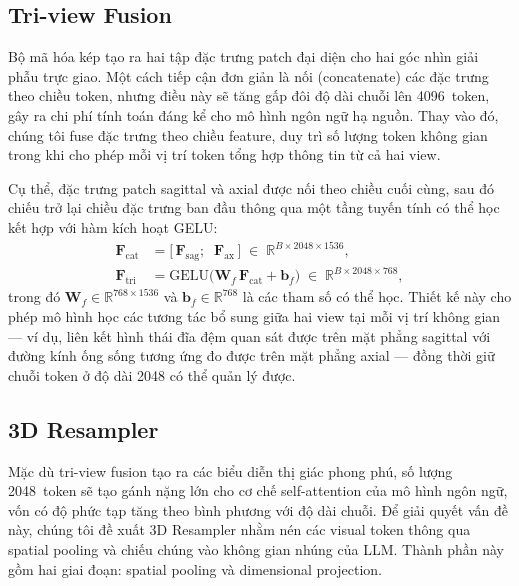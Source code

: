 \subsection{Tri-view Fusion}

Bộ mã hóa kép tạo ra hai tập đặc trưng patch đại diện cho hai góc nhìn giải phẫu trực giao. Một cách tiếp cận đơn giản là nối (concatenate) các đặc trưng theo chiều token, nhưng điều này sẽ tăng gấp đôi độ dài chuỗi lên 4096~token, gây ra chi phí tính toán đáng kể cho mô hình ngôn ngữ hạ nguồn. Thay vào đó, chúng tôi fuse đặc trưng theo chiều feature, duy trì số lượng token không gian trong khi cho phép mỗi vị trí token tổng hợp thông tin từ cả hai view.

Cụ thể, đặc trưng patch sagittal và axial được nối theo chiều cuối cùng, sau đó chiếu trở lại chiều đặc trưng ban đầu thông qua một tầng tuyến tính có thể học kết hợp với hàm kích hoạt GELU:
\begin{align}
\mathbf{F}_{\text{cat}} &= \big[\, \mathbf{F}_{\text{sag}} ;\;\; \mathbf{F}_{\text{ax}} \,\big] \;\in\; \mathbb{R}^{B \times 2048 \times 1536}, \label{eq:concat} \\[4pt]
\mathbf{F}_{\text{tri}} &= \text{GELU}\!\big(\mathbf{W}_f \, \mathbf{F}_{\text{cat}} + \mathbf{b}_f\big) \;\in\; \mathbb{R}^{B \times 2048 \times 768}, \label{eq:trifuse}
\end{align}
trong đó $\mathbf{W}_f \in \mathbb{R}^{768 \times 1536}$ và $\mathbf{b}_f \in \mathbb{R}^{768}$ là các tham số có thể học. Thiết kế này cho phép mô hình học các tương tác bổ sung giữa hai view tại mỗi vị trí không gian --- ví dụ, liên kết hình thái đĩa đệm quan sát được trên mặt phẳng sagittal với đường kính ống sống tương ứng đo được trên mặt phẳng axial --- đồng thời giữ chuỗi token ở độ dài 2048 có thể quản lý được.


\subsection{3D Resampler}

Mặc dù tri-view fusion tạo ra các biểu diễn thị giác phong phú, số lượng 2048~token sẽ tạo gánh nặng lớn cho cơ chế self-attention của mô hình ngôn ngữ, vốn có độ phức tạp tăng theo bình phương với độ dài chuỗi. Để giải quyết vấn đề này, chúng tôi đề xuất 3D Resampler nhằm nén các visual token thông qua spatial pooling và chiếu chúng vào không gian nhúng của LLM. Thành phần này gồm hai giai đoạn: spatial pooling và dimensional projection.

